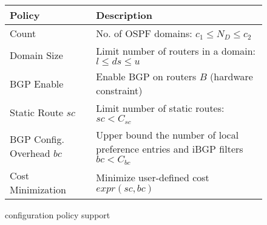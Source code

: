 \begin{wrapfigure}{r}{0.6\textwidth}
\vspace{-7mm}
\begin{minipage}{\linewidth}
	\begin{tabular}{m{6em}  m{15.6em} } 
			{\bf Policy} & {\bf Description} \\ 
			\hline
			Count  & No. of OSPF domains: $c_1\leq N_D\leq c_2$  \\ \hline
			Domain Size  & Limit number of routers in a domain: $l\leq ds\leq u$ \\ \hline
			BGP Enable & Enable BGP on routers $B$ (hardware constraint) \\ \hline
			Static Route ${sc}$ & Limit number of static routes: $sc < C_{sc}$ \\ \hline
			BGP Config. Overhead $bc$ & Upper bound the number of local preference entries and iBGP filters $bc < C_{bc}$ \\ \hline
			Cost Minimization & Minimize user-defined cost $expr(sc, bc)$
		\end{tabular}
				
	\end{minipage}
\caption{\name configuration policy support} 
\label{tab:configpolicysupport}
\end{wrapfigure}